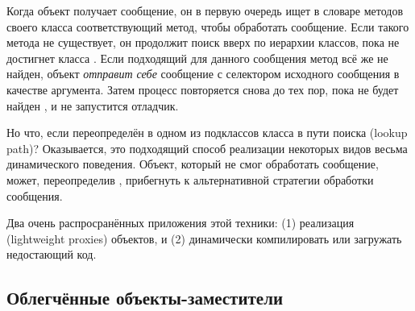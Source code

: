 \documentclass[a4paper,10pt,twoside]{book}
\begin{document}
{%
Когда объект получает сообщение, он в первую очередь ищет в словаре методов своего класса соответствующий метод, чтобы обработать сообщение.
Если такого метода не существует, он продолжит поиск вверх по иерархии классов, пока не достигнет класса . Если подходящий для данного сообщения метод всё же не найден, объект \emph{отправит себе} сообщение  с селектором исходного сообщения в качестве аргумента.
Затем процесс повторяется снова до тех пор, пока не будет найден , и не запустится отладчик.

Но что, если  переопределён в одном из подклассов класса  в пути поиска (lookup path)?
Оказывается, это подходящий способ реализации некоторых видов весьма динамического поведения. Объект, который не смог обработать сообщение, может, переопределив , прибегнуть к альтернативной стратегии обработки сообщения.

Два очень распросранённых приложения этой техники: (1) реализация  (lightweight proxies) объектов, и (2) динамически компилировать или загружать недостающий код.

\subsection{Облегчённые объекты-заместители}

}
\end{document}

